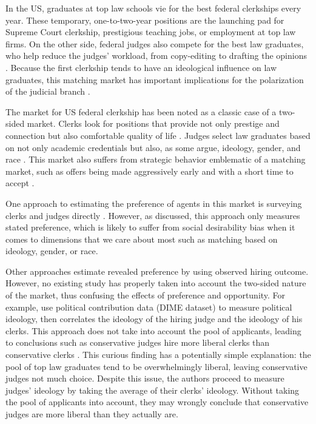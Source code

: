 In the US, graduates at top law schools vie for the best federal
clerkships every year. These temporary, one-to-two-year positions are the launching pad for Supreme Court clerkship,
prestigious teaching jobs, or employment at top law firms. On the other side,
federal judges also compete for the best law graduates, who help reduce the
judges' workload, from copy-editing to drafting the opinions
\citep{Gulati2016, Posner2001}. Because the first clerkship tends to have an ideological influence
on law graduates, this matching market has important implications for the
polarization of the judicial branch \citep{Liptak2007}.

The market for US federal clerkship has been noted as a classic case of a two-sided market.
Clerks look for positions that provide not only prestige and connection but also
comfortable quality of life \citep{Posner2001}. Judges select law graduates
based on not only academic credentials but also, as some argue, ideology, gender,
and race \citep{Slotnick1984}. This market also suffers from strategic behavior
emblematic of a matching market, such as offers being
made aggressively early and with a short time to accept \citep{Posner2001, Posner2007}.

One approach to estimating the preference of agents in this market is surveying clerks and judges
directly \citep{Peppers2008}. However, as discussed, this approach only measures 
stated preference, which is likely to suffer from social desirability bias when it comes to dimensions
that we care about most such as matching based on ideology, gender, or
race.

Other approaches estimate revealed preference by using observed hiring
outcome. However, no existing study has properly taken into
account the two-sided nature of the market, thus confusing the effects of
preference and opportunity. For example, \citet{Bonica2017} use political
contribution data (DIME dataset) to measure political ideology, then correlates
the ideology of the hiring judge and the ideology of his clerks. This
approach does not take into account the pool of applicants, leading to
conclusions such as conservative judges hire more liberal clerks
than conservative clerks \citep[31]{Bonica2017}. This curious finding has a
potentially simple explanation: the pool of top law graduates tend to be
overwhelmingly liberal, leaving conservative judges not much choice.
Despite this issue, the authors proceed to measure judges' ideology by taking
the average of their clerks' ideology. Without taking the pool of applicants into
account, they may wrongly conclude that conservative judges are more liberal than
they actually are.

